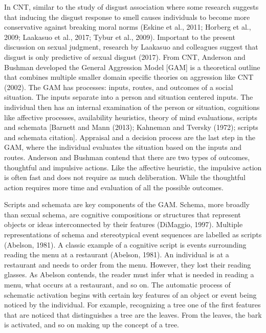 \documentclass[
  english,
  donotrepeattitle,doc, 12pt, a4paper,floatsintext]{apa7}
\begin{document}
In CNT, similar to the study of disgust association where some research suggests that inducing the disgust response to smell causes individuals to become more conservative against breaking moral norms (Eskine et al., 2011; Horberg et al., 2009; Laakasuo et al., 2017; Tybur et al., 2009). Important to the present discussion on sexual judgment, research by Laakasuo and colleagues suggest that disgust is only predictive of sexual disgust (2017). From CNT, Anderson and Bushman developed the General Aggression Model {[}GAM{]} is a theoretical outline that combines multiple smaller domain specific theories on aggression like CNT (2002). The GAM has processes: inputs, routes, and outcomes of a social situation. The inputs separate into a person and situation centered inputs. The individual then has an internal examination of the person or situation, cognitions like affective processes, availability heuristics, theory of mind evaluations, scripts and schemata {[}Barnett and Mann (2013); Kahneman and Tversky (1972); scripts and schemata citation{]}. Appraisal and a decision process are the last step in the GAM, where the individual evaluates the situation based on the inputs and routes. Anderson and Bushman contend that there are two types of outcomes, thoughtful and impulsive actions. Like the affective heuristic, the impulsive action is often fast and does not require as much deliberation. While the thoughtful action requires more time and evaluation of all the possible outcomes.

Scripts and schemata are key components of the GAM. Schema, more broadly than sexual schema, are cognitive compositions or structures that represent objects or ideas interconnected by their features (DiMaggio, 1997). Multiple representations of schema and stereotypical event sequences are labelled as scripts (Abelson, 1981). A classic example of a cognitive script is events surrounding reading the menu at a restaurant (Abelson, 1981). An individual is at a restaurant and needs to order from the menu. However, they lost their reading glasses. As Abelson contends, the reader must infer what is needed in reading a menu, what occurs at a restaurant, and so on. The automatic process of schematic activation begins with certain key features of an object or event being noticed by the individual. For example, recognizing a tree one of the first features that are noticed that distinguishes a tree are the leaves. From the leaves, the bark is activated, and so on making up the concept of a tree.
\end{document}
